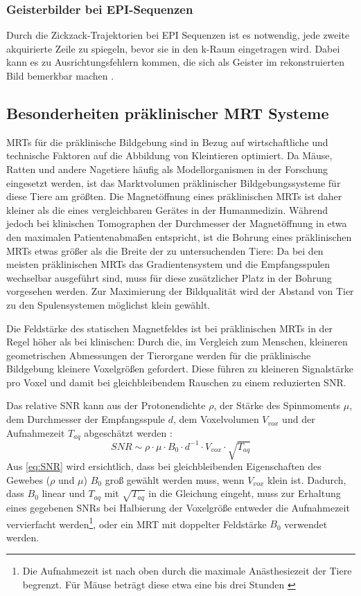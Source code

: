 \subsubsection{Geisterbilder bei EPI-Sequenzen}
Durch die Zickzack-Trajektorien bei EPI Sequenzen ist es notwendig, jede zweite akquirierte Zeile zu spiegeln, bevor sie in den k-Raum eingetragen wird. Dabei kann es zu Ausrichtungsfehlern kommen, die sich als Geister im rekonstruierten Bild bemerkbar machen \cite{Ianni2018}.

\subsection{Besonderheiten präklinischer MRT Systeme}
MRTs für die präklinische Bildgebung sind in Bezug auf wirtschaftliche und technische Faktoren auf die Abbildung von Kleintieren optimiert. Da Mäuse, Ratten und andere Nagetiere häufig als Modellorganismen in der Forschung eingesetzt werden, ist das Marktvolumen präklinischer Bildgebungssysteme für diese Tiere am größten. \cite{GBanimalStat} Die Magnetöffnung eines präklinischen MRTs ist daher kleiner als die eines vergleichbaren Gerätes in der Humanmedizin. Während jedoch bei klinischen Tomographen der Durchmesser der Magnetöffnung in etwa den maximalen Patientenabmaßen entspricht, ist die Bohrung eines präklinischen MRTs etwas größer als die Breite der zu untersuchenden Tiere: Da bei den meisten präklinischen MRTs das Gradientensystem und die Empfangsspulen wechselbar ausgeführt sind, muss für diese zusätzlicher Platz in der Bohrung vorgesehen werden. Zur Maximierung der Bildqualität wird der Abstand von Tier zu den Spulensystemen möglichst klein gewählt.

Die Feldstärke des statischen Magnetfeldes ist bei präklinischen MRTs in der Regel höher als bei klinischen: Durch die, im Vergleich zum Menschen, kleineren geometrischen Abmessungen der Tierorgane werden für die präklinische Bildgebung kleinere Voxelgrößen gefordert. Diese führen zu kleineren Signalstärke pro Voxel und damit bei gleichbleibendem Rauschen zu einem reduzierten SNR.

Das relative SNR kann aus der Protonendichte $\rho$, der Stärke des Spinmoments $\mu$, dem Durchmesser der Empfangsspule $d$, dem Voxelvolumen $V_{vox}$ und der Aufnahmezeit $T_{aq}$ abgeschätzt werden \cite[S.~161]{Kiessling2017}:
\begin{equation}
\label{eq:SNR}
	SNR \sim \rho \cdot \mu \cdot B_0 \cdot d^{-1} \cdot V_{vox} \cdot \sqrt{T_{aq}}
\end{equation}
Aus \autoref{eq:SNR} wird ersichtlich, dass bei gleichbleibenden Eigenschaften des Gewebes ($\rho$ und $\mu$) $B_0$ groß gewählt werden muss, wenn $V_{vox}$ klein ist.
Dadurch, dass $B_0$ linear und $T_{aq}$ mit $\sqrt{T_{aq}}$ in die Gleichung eingeht, muss zur Erhaltung eines gegebenen SNRs bei Halbierung der Voxelgröße entweder die Aufnahmezeit vervierfacht werden\footnote{Die Aufnahmezeit ist nach oben durch die maximale Anästhesiezeit der Tiere begrenzt. Für Mäuse beträgt diese etwa eine bis drei Stunden \cite{Kiessling2017}}, oder ein MRT mit doppelter Feldstärke $B_0$ verwendet werden.

